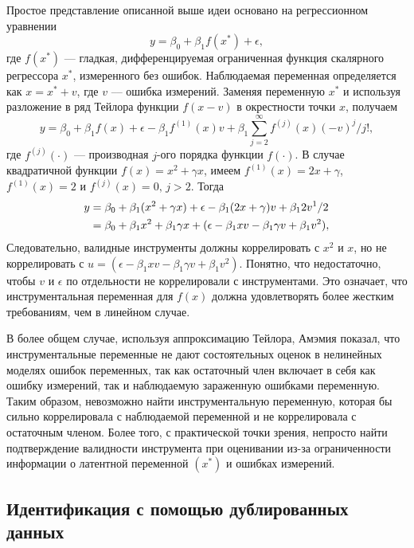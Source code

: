 Простое представление описанной выше идеи основано на регрессионном уравнении
\begin{equation}
y=\beta_0 +\beta_1 f(x^*)+ \epsilon,
\end{equation}
где $f(x^*)$ --- гладкая, дифференцируемая ограниченная функция скалярного регрессора $x^*$, измеренного без ошибок. Наблюдаемая переменная определяется как $x=x^*+v$, где $v$ --– ошибка измерений. Заменяя переменную $x^*$ и используя разложение в ряд Тейлора функции $f(x-v)$ в окрестности точки $x$, получаем
\begin{equation}
y=\beta_0 +\beta_1 f(x)+ \epsilon - \beta_1 f^{(1)}(x)v + \beta_1 \sum \limits^{\infty}_{j=2} f^{(j)}(x)(-v)^j/j!,
\end{equation}
где $f^{(j)}(\cdot)$ --- производная $j$-ого порядка функции $f(\cdot)$. В случае квадратичной функции $f(x)=x^2+\gamma x$, имеем $f^{(1)}(x)=2x+ \gamma$, $f^{(1)}(x)=2$ и $f^{(j)}(x)=0, \, j>2$. Тогда
\begin{align}
y&=\beta_0 + \beta_1 (x^2+ \gamma x) + \epsilon - \beta_1 (2x+ \gamma)v + \beta_1 2v^1 /2 \notag \\
&= \beta_0 + \beta_1 x^2 + \beta_1 \gamma x + (\epsilon- \beta_1 xv - \beta_1 \gamma v + \beta_1 v^2),
\end{align}
Следовательно, валидные инструменты должны  коррелировать с $x^2$ и $x$, но не коррелировать с $u=(\epsilon- \beta_1 xv - \beta_1 \gamma v + \beta_1 v^2)$. Понятно, что недостаточно, чтобы $v$ и $\epsilon$ по отдельности не коррелировали с инструментами. Это означает, что инструментальная переменная для $f(x)$ должна удовлетворять более жестким требованиям, чем в линейном случае.

В более общем случае, используя аппроксимацию Тейлора, Амэмия показал, что инструментальные переменные не дают состоятельных оценок в нелинейных моделях ошибок переменных, так как остаточный член включает в себя как ошибку измерений, так и наблюдаемую зараженную ошибками переменную. Таким образом, невозможно найти инструментальную переменную, которая бы сильно коррелировала с наблюдаемой переменной и не коррелировала с остаточным членом. Более того, с практической точки зрения, непросто найти подтверждение валидности инструмента при оценивании из-за ограниченности информации о латентной переменной $(x^*)$ и ошибках измерений.
 
\subsection{Идентификация с помощью дублированных данных} 

